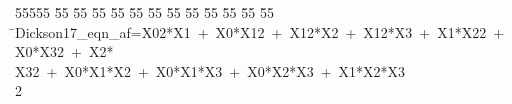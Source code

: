 %
%
\begin{tabbing}
55555 \= 55 \= 55 \= 55 \= 55 \= 55 \= 55 \= 55 \= 55 \= 55 \= 55 \= 55 \= 55 \= \>Dickson17\_eqn\_af=X02*X1\ +\ X0*X12\ +\ X12*X2\ +\ X12*X3\ +\ X1*X22\ +\ X0*X32\ +\ X2*\\[0pt]
\>X32\ +\ X0*X1*X2\ +\ X0*X1*X3\ +\ X0*X2*X3\ +\ X1*X2*X3\\[0pt]
2\>\end{tabbing}

